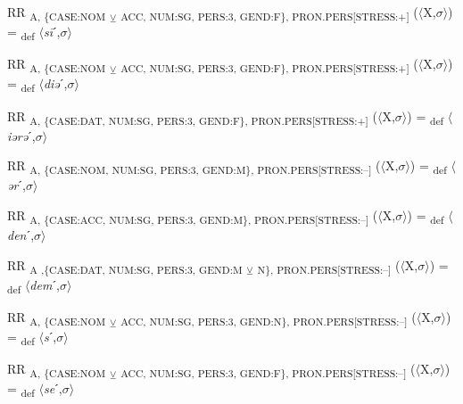 {\begin{exe}
 RR \textsubscript{A, \{CASE:NOM} \textsubscript{${\veebar}$}\textsubscript{ ACC, NUM:SG, PERS:3, GEND:F\}, PRON.PERS[STRESS:+]} ($\langle$X,$\sigma $$\rangle$) = \textsubscript{def} $\langle$\textit{s\=i}ˊ,$\sigma $$\rangle$
\end{exe}

\begin{exe}
 RR \textsubscript{A, \{CASE:NOM} \textsubscript{${\veebar}$}\textsubscript{ ACC, NUM:SG, PERS:3, GEND:F\}, PRON.PERS[STRESS:+]} ($\langle$X,$\sigma $$\rangle$) = \textsubscript{def} $\langle$\textit{diə}ˊ,$\sigma $$\rangle$
\end{exe}

\begin{exe}
 RR \textsubscript{A, \{CASE:DAT, NUM:SG, PERS:3, GEND:F\}, PRON.PERS[STRESS:+]} ($\langle$X,$\sigma $$\rangle$) = \textsubscript{def} $\langle$\textit{iərə}ˊ,$\sigma $$\rangle$
\end{exe}

\begin{exe}
 RR \textsubscript{A, \{CASE:NOM, NUM:SG, PERS:3, GEND:M\}, PRON.PERS[STRESS:–]} ($\langle$X,$\sigma $$\rangle$) = \textsubscript{def} $\langle$\textit{ər}ˊ,$\sigma $$\rangle$
\end{exe}

\begin{exe}
 RR \textsubscript{A, \{CASE:ACC, NUM:SG, PERS:3, GEND:M\}, PRON.PERS[STRESS:–]} ($\langle$X,$\sigma $$\rangle$) = \textsubscript{def} $\langle$\textit{den}ˊ,$\sigma $$\rangle$
\end{exe}

\begin{exe}
 RR \textsubscript{A ,\{CASE:DAT, NUM:SG, PERS:3, GEND:M} \textsubscript{${\veebar}$}\textsubscript{ N\}, PRON.PERS[STRESS:–]} ($\langle$X,$\sigma $$\rangle$) = \textsubscript{def} $\langle$\textit{dem}ˊ,$\sigma $$\rangle$
\end{exe}

\begin{exe}
 RR \textsubscript{A, \{CASE:NOM} \textsubscript{${\veebar}$}\textsubscript{ ACC, NUM:SG, PERS:3, GEND:N\}, PRON.PERS[STRESS:–]} ($\langle$X,$\sigma $$\rangle$) = \textsubscript{def} $\langle$\textit{s}ˊ,$\sigma $$\rangle$
\end{exe}

\begin{exe}
 RR \textsubscript{A, \{CASE:NOM} \textsubscript{${\veebar}$}\textsubscript{ ACC, NUM:SG, PERS:3, GEND:F\}, PRON.PERS[STRESS:–]} ($\langle$X,$\sigma $$\rangle$) = \textsubscript{def} $\langle$\textit{se}ˊ,$\sigma $$\rangle$
\end{exe}

}

